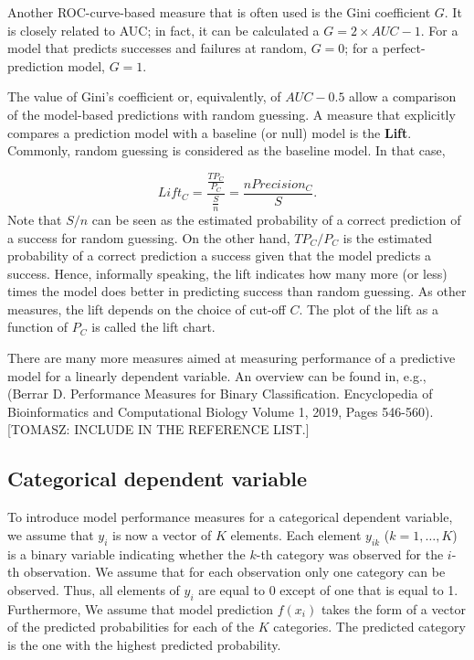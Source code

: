 \documentclass[]{krantz}
\begin{document}
Another ROC-curve-based measure that is often used is the Gini coefficient \(G\). It is closely related to AUC; in fact, it can be calculated a \(G = 2 \times AUC - 1\). For a model that predicts successes and failures at random, \(G=0\); for a perfect-prediction model, \(G = 1\).

The value of Gini's coefficient or, equivalently, of \(AUC-0.5\) allow a comparison of the model-based predictions with random guessing. A measure that explicitly compares a prediction model with a baseline (or null) model is the \textbf{Lift}. Commonly, random guessing is considered as the baseline model. In that case,

\[
Lift_C  = \frac{\frac{TP_C}{P_C}}{\frac{S}{n}} = \frac{n Precision_C}{S}.
\]
Note that \(S/n\) can be seen as the estimated probability of a correct prediction of a success for random guessing. On the other hand, \(TP_C/P_C\) is the estimated probability of a correct prediction a success given that the model predicts a success. Hence, informally speaking, the lift indicates how many more (or less) times the model does better in predicting success than random guessing. As other measures, the lift depends on the choice of cut-off \(C\). The plot of the lift as a function of \(P_C\) is called the lift chart.

There are many more measures aimed at measuring performance of a predictive model for a linearly dependent variable. An overview can be found in, e.g., (Berrar D. Performance Measures for Binary Classification. Encyclopedia of Bioinformatics and Computational Biology Volume 1, 2019, Pages 546-560). {[}TOMASZ: INCLUDE IN THE REFERENCE LIST.{]}

\hypertarget{modelPerformanceMethodCateg}{%
\subsection{Categorical dependent variable}\label{modelPerformanceMethodCateg}}

To introduce model performance measures for a categorical dependent variable, we assume that \(y_i\) is now a vector of \(K\) elements. Each element \(y_{ik}\) (\(k=1,\ldots,K\)) is a binary variable indicating whether the \(k\)-th category was observed for the \(i\)-th observation. We assume that for each observation only one category can be observed. Thus, all elements of \(y_i\) are equal to 0 except of one that is equal to 1. Furthermore, We assume that model prediction \(f(x_i)\) takes the form of a vector of the predicted probabilities for each of the \(K\) categories. The predicted category is the one with the highest predicted probability.
\end{document}

